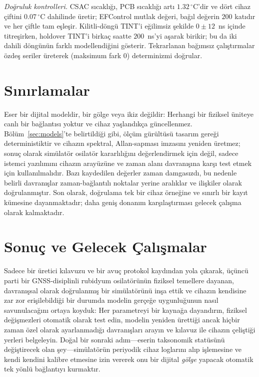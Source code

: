 \documentclass[9pt,twocolumn,a4paper]{extarticle}
\begin{document}
\emph{Doğruluk kontrolleri.} CSAC sıcaklığı, PCB sıcaklığı artı $1.32\,^\circ$C'dir ve dört cihaz çiftini $0.07\,^\circ$C dahilinde üretir; EFControl mutlak değeri, bağıl değerin $200$ katıdır ve her çiftle tam eşleşir. Kilitli-döngü TINT'i eğilimsiz şekilde $0 \pm 12$~ns içinde titreşirken, holdover TINT'i birkaç saatte $200$~ns'yi aşarak birikir; bu da iki dahili döngünün farklı modellendiğini gösterir. Tekrarlanan bağımsız çalıştırmalar özdeş seriler üreterek (maksimum fark $0$) determinizmi doğrular.

\section{Sınırlamalar}
Eser bir dijital modeldir, bir gölge veya ikiz değildir: Herhangi bir fiziksel üniteye canlı bir bağlantısı yoktur ve cihaz yaşlandıkça güncellenmez. Bölüm~\ref{sec:models}'te belirtildiği gibi, ölçüm gürültüsü tasarım gereği deterministiktir ve cihazın spektral, Allan-sapması imzasını yeniden üretmez; sonuç olarak simülatör osilatör kararlılığını değerlendirmek için değil, sadece istemci yazılımını cihazın arayüzüne ve zaman alanı davranışına karşı test etmek için kullanılmalıdır. Bazı kaydedilen değerler zaman damgasızdı, bu nedenle belirli davranışlar zaman-bağlantılı noktalar yerine aralıklar ve ilişkiler olarak doğrulanmıştır. Son olarak, doğrulama tek bir cihaz örneğine ve sınırlı bir kayıt kümesine dayanmaktadır; daha geniş donanım karşılaştırması gelecek çalışma olarak kalmaktadır.

\section{Sonuç ve Gelecek Çalışmalar}
Sadece bir üretici kılavuzu ve bir avuç protokol kaydından yola çıkarak, üçüncü parti bir GNSS-disiplinli rubidyum osilatörünün fiziksel temellere dayanan, davranışsal olarak doğrulanmış bir simülatörünü inşa ettik ve cihazın kendisine zar zor erişilebildiği bir durumda modelin gerçeğe uygunluğunun nasıl savunulacağını ortaya koyduk: Her parametreyi bir kaynağa dayandırın, fiziksel değişmezleri otomatik olarak test edin, modelin yeniden ürettiği ancak hiçbir zaman özel olarak ayarlanmadığı davranışları arayın ve kılavuz ile cihazın çeliştiği yerleri belgeleyin. Doğal bir sonraki adım---eserin taksonomik statüsünü değiştirecek olan şey---simülatörün periyodik cihaz loglarını alıp işlemesine ve kendi kendini kalibre etmesine izin vererek onu bir dijital \emph{gölge} yapacak otomatik tek yönlü bağlantıyı kurmaktır.
\end{document}
